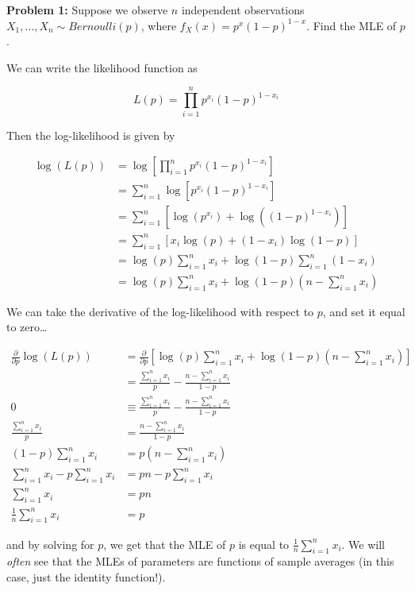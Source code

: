 \documentclass[
  letterpaper,
  DIV=11,
  numbers=noendperiod]{scrreprt}
\begin{document}
\textbf{Problem 1:} Suppose we observe \(n\) independent observations
\(X_1, \dots, X_n \sim Bernoulli(p)\), where
\(f_X(x) = p^x(1-p)^{1-x}\). Find the MLE of \(p\).

We can write the likelihood function as

\[
L(p) = \prod_{i = 1}^n p^{x_i} (1-p)^{1 - x_i} 
\]

Then the log-likelihood is given by

\begin{align*} 
\log(L(p)) & = \log \left[ \prod_{i = 1}^n p^{x_i} (1-p)^{1 - x_i} \right] \\ 
& = \sum_{i = 1}^n \log \left[p^{x_i} (1-p)^{1 - x_i} \right] \\
& = \sum_{i = 1}^n \left[ \log(p^{x_i}) + \log((1-p)^{1-x_i}) \right] \\
& = \sum_{i = 1}^n \left[ x_i \log(p) + (1 - x_i) \log(1-p) \right] \\
& = \log(p)\sum_{i = 1}^n x_i  + \log(1-p) \sum_{i = 1}^n (1 - x_i)  \\
& = \log(p)\sum_{i = 1}^n x_i  + \log(1-p)  (n - \sum_{i = 1}^n x_i)
\end{align*}

We can take the derivative of the log-likelihood with respect to \(p\),
and set it equal to zero\ldots{}

\begin{align*} 
\frac{\partial}{\partial p} \log(L(p)) & = \frac{\partial}{\partial p} \left[ \log(p)\sum_{i = 1}^n x_i  + \log(1-p)  (n - \sum_{i = 1}^n x_i) \right] \\
& = \frac{\sum_{i = 1}^n x_i }{p} - \frac{n - \sum_{i = 1}^n x_i}{1-p} \\
0 & \equiv \frac{\sum_{i = 1}^n x_i }{p} - \frac{n - \sum_{i = 1}^n x_i}{1-p} \\
\frac{\sum_{i = 1}^n x_i }{p}  & = \frac{n - \sum_{i = 1}^n x_i}{1-p} \\
(1-p) \sum_{i = 1}^n x_i & = p (n - \sum_{i = 1}^n x_i) \\
\sum_{i = 1}^n x_i - p\sum_{i = 1}^n x_i & = pn - p \sum_{i = 1}^n x_i \\
\sum_{i = 1}^n x_i & = pn \\
\frac{1}{n} \sum_{i = 1}^n x_i & = p
\end{align*}

and by solving for \(p\), we get that the MLE of \(p\) is equal to
\(\frac{1}{n}\sum_{i = 1}^n x_i\). We will \emph{often} see that the
MLEs of parameters are functions of sample averages (in this case, just
the identity function!).
\end{document}
